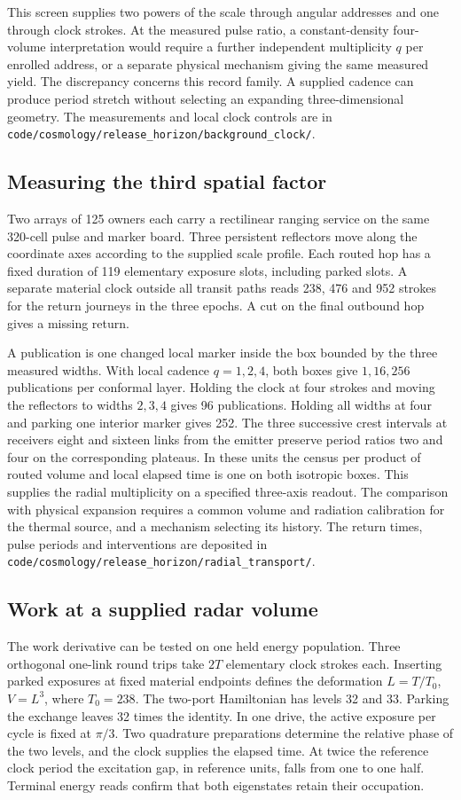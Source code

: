 \documentclass[11pt]{article}
\theoremstyle{remark}
\theoremstyle{plain}
\newcommand{\pathref}[1]{\nolinkurl{#1}}
\begin{document}
This screen supplies two powers of the scale through angular addresses
and one through clock strokes. At the measured pulse ratio, a
constant-density four-volume interpretation would require a further
independent multiplicity \(q\) per enrolled address, or a separate
physical mechanism giving the same measured yield. The discrepancy
concerns this record family. A supplied cadence can produce period
stretch without selecting an expanding three-dimensional geometry.
The measurements and local clock controls are in
\pathref{code/cosmology/release_horizon/background_clock/}.

\subsection{Measuring the third spatial factor}
Two arrays of 125 owners each carry a rectilinear ranging service on
the same 320-cell pulse and marker board. Three persistent reflectors
move along the coordinate axes according to the supplied scale profile.
Each routed hop has a fixed duration of 119 elementary exposure slots,
including parked slots. A separate material clock outside all transit
paths reads 238, 476 and 952 strokes for the return journeys in the
three epochs. A cut on the final outbound hop gives a missing return.

A publication is one changed local marker inside the box bounded by
the three measured widths. With local cadence \(q=1,2,4\), both boxes
give \(1,16,256\) publications per conformal layer. Holding the clock
at four strokes and moving the reflectors to widths \(2,3,4\) gives
96 publications. Holding all widths at four and parking one interior
marker gives 252. The three successive crest intervals at receivers
eight and sixteen links from the emitter preserve period ratios two
and four on the corresponding plateaus. In these units the census
per product of routed volume and local elapsed time is one on both
isotropic boxes. This supplies the radial multiplicity on a specified
three-axis readout. The comparison with physical expansion requires a
common volume and radiation calibration for the thermal source, and a
mechanism selecting its history. The return times, pulse periods and
interventions are deposited in
\mbox{\pathref{code/cosmology/release_horizon/radial_transport/}}.

\subsection{Work at a supplied radar volume}
The work derivative can be tested on one held energy population.
Three orthogonal one-link round trips take \(2T\) elementary clock
strokes each. Inserting parked exposures at fixed material endpoints
defines the deformation \(L=T/T_0\), \(V=L^3\), where \(T_0=238\).
The two-port Hamiltonian has levels 32 and 33. Parking the exchange
leaves 32 times the identity. In one drive, the active exposure per
cycle is fixed at \(\pi/3\). Two quadrature preparations determine the
relative phase of the two levels, and the clock supplies the elapsed
time. At twice the reference clock period the excitation gap, in
reference units, falls from one to one half. Terminal energy reads
confirm that both eigenstates retain their occupation.
\end{document}
